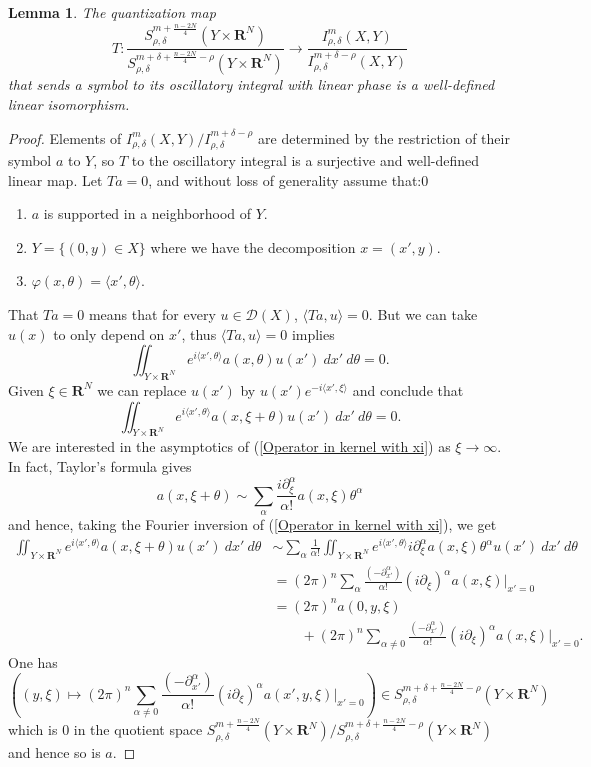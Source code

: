 \documentclass[reqno,12pt,letterpaper]{amsart}
\newcommand{\RR}{\mathbf{R}}
\newtheorem{lemma}[theorem]{Lemma}
\theoremstyle{definition}
\begin{document}
\begin{lemma}
The quantization map
$$T: \frac{S^{m+\frac{n-2N}{4}}_{\rho,\delta}(Y \times \RR^N)}{S^{m+\delta+\frac{n-2N}{4}-\rho}_{\rho,\delta}(Y \times \RR^N)} \to \frac{I^m_{\rho,\delta}(X, Y)}{I^{m+\delta-\rho}_{\rho,\delta}(X,Y)}$$
that sends a symbol to its oscillatory integral with linear phase is a well-defined linear isomorphism.
\end{lemma}
\begin{proof}
Elements of $I^m_{\rho,\delta}(X, Y)/I^{m+\delta-\rho}_{\rho,\delta}$ are determined by the restriction of their symbol $a$ to $Y$, so $T$ to the oscillatory integral is a surjective and well-defined linear map.
Let $Ta = 0$, and without loss of generality assume that:0
\begin{enumerate}
\item $a$ is supported in a neighborhood of $Y$.
\item $Y = \{(0, y) \in X\}$ where we have the decomposition $x = (x', y)$.
\item $\varphi(x, \theta)=\langle x', \theta\rangle$.
\end{enumerate}
That $Ta = 0$ means that for every $u \in \mathcal D(X)$, $\langle Ta, u\rangle = 0$. But we can take $u(x)$ to only depend on $x'$, thus $\langle Ta, u\rangle = 0$ implies
$$\iint_{Y \times \RR^N} e^{i\langle x', \theta\rangle} a(x, \theta) u(x') ~dx' ~d\theta = 0.$$
Given $\xi \in \RR^N$ we can replace $u(x')$ by $u(x')e^{-i\langle x',\xi\rangle}$ and conclude that
\begin{equation}
\label{Operator in kernel with xi}
\iint_{Y \times \RR^N} e^{i\langle x', \theta\rangle} a(x, \xi + \theta) u(x') ~dx' ~d\theta = 0.
\end{equation}
We are interested in the asymptotics of (\ref{Operator in kernel with xi}) as $\xi \to \infty$.
In fact, Taylor's formula gives
$$a(x, \xi + \theta) \sim \sum_\alpha \frac{i\partial_\xi^\alpha}{\alpha!} a(x, \xi)\theta^\alpha$$
and hence, taking the Fourier inversion of (\ref{Operator in kernel with xi}), we get
\begin{align*}
\iint_{Y \times \RR^N} e^{i\langle x', \theta\rangle} a(x, \xi + \theta) u(x') ~dx' ~d\theta &\sim \sum_\alpha \frac{1}{\alpha!} \iint_{Y \times \RR^N} e^{i\langle x', \theta\rangle} i\partial_\xi^\alpha a(x, \xi) \theta^\alpha u(x')~dx' ~d\theta \\
&= (2\pi)^n \sum_\alpha \frac{(-\partial_{x'}^\alpha)}{\alpha!}(i\partial_\xi)^\alpha a(x, \xi)|_{x' = 0}\\
&= (2\pi)^n a(0, y, \xi) \\
&\qquad+ (2\pi)^n\sum_{\alpha \neq 0}\frac{(-\partial_{x'}^\alpha)}{\alpha!}(i\partial_\xi)^\alpha a(x, \xi)|_{x' = 0}.
\end{align*}
One has
$$\left((y, \xi) \mapsto (2\pi)^n\sum_{\alpha \neq 0}\frac{(-\partial_{x'}^\alpha)}{\alpha!}(i\partial_\xi)^\alpha a(x', y, \xi)|_{x' = 0}\right) \in S^{m+\delta+\frac{n-2N}{4}-\rho}_{\rho,\delta}(Y \times \RR^N)$$
which is $0$ in the quotient space $S^{m+\frac{n-2N}{4}}_{\rho,\delta}(Y \times \RR^N)/S^{m+\delta+\frac{n-2N}{4}-\rho}_{\rho,\delta}(Y \times \RR^N)$ and hence so is $a$.
\end{proof}
\end{document}
